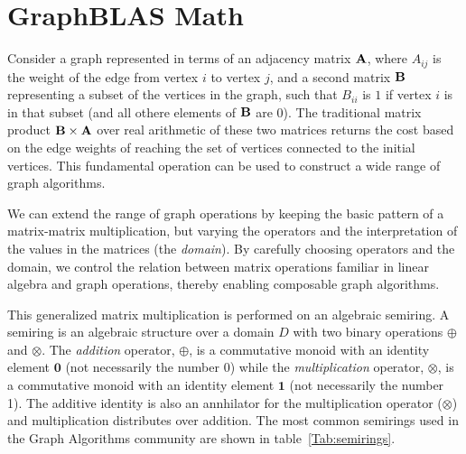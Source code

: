 \section{GraphBLAS Math}
\label{sec:math}

Consider a graph represented in terms of an adjacency matrix ${\bf A}$,
where $A_{ij}$ is the weight of the edge from vertex $i$ to vertex $j$,
and a second matrix ${\bf B}$ representing a subset of the vertices
in the graph, such that $B_{ii}$ is $1$ if vertex $i$ is in that subset
(and all othere elements of ${\bf B}$ are 0).  The traditional matrix
product ${\bf B} \times {\bf A}$ over real arithmetic of these two matrices returns the cost
based on the edge weights of reaching the set of vertices
connected to the initial vertices.   This fundamental operation can be
used to construct a wide range of graph algorithms.

We can extend the range of graph operations by keeping the basic
pattern of a matrix-matrix multiplication, but varying
the operators and the interpretation of the values in the matrices (the \emph{domain}).
By carefully choosing operators and the domain, we control the
relation between matrix operations familiar in linear algebra and graph operations, thereby enabling
composable graph algorithms.

This generalized matrix multiplication is performed on an algebraic semiring.   
A semiring is an algebraic
structure over a domain $D$ with two binary operations $\oplus$ and $\otimes$.
The \emph{addition} operator, $\oplus$, is a commutative monoid with an identity 
element $\mathbf{0}$ (not necessarily the number 0)
while the \emph{multiplication} operator, $\otimes$, is a commutative monoid with an 
identity element $\mathbf{1}$ (not necessarily the number 1).  The additive 
identity is also an annhilator for the multiplication 
operator ($\otimes$) and multiplication distributes over addition.  The most 
common semirings used in the Graph Algorithms community are 
shown in table~\ref{Tab:semirings}.
  
